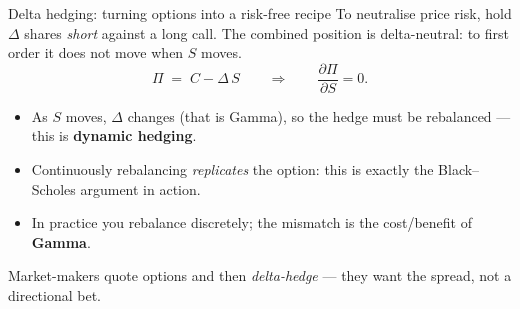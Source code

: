 \documentclass[11pt,aspectratio=169]{beamer}
\newcommand{\call}{C}
\newcommand{\und}{S}                         %
\newcommand{\keybox}[1]{%
  \begin{beamercolorbox}[wd=\textwidth,sep=0.6em,rounded=true]{}%
    \colorbox{soft}{\parbox{\dimexpr\textwidth-1.4em}{\color{ink}#1}}%
  \end{beamercolorbox}}
\begin{document}
\begin{frame}{Delta hedging: turning options into a risk-free recipe}
  To neutralise price risk, hold $\Delta$ shares \emph{short} against a long
  call. The combined position is \alert{delta-neutral}: to first order it
  does not move when $\und$ moves.
  \[
    \Pi \;=\; \call - \Delta\,\und
    \qquad\Longrightarrow\qquad
    \frac{\partial \Pi}{\partial \und}=0 .
  \]
  \begin{itemize}
    \item As $\und$ moves, $\Delta$ changes (that is Gamma), so the hedge must be \alert{rebalanced} — this is \textbf{dynamic hedging}.
    \item Continuously rebalancing \emph{replicates} the option: this is exactly the Black--Scholes argument in action.
    \item In practice you rebalance discretely; the mismatch is the cost/benefit of \textbf{Gamma}.
  \end{itemize}
  \vspace{0.2em}
  \keybox{Market-makers quote options and then \emph{delta-hedge} — they want the spread, not a directional bet.}
\end{frame}
\end{document}

